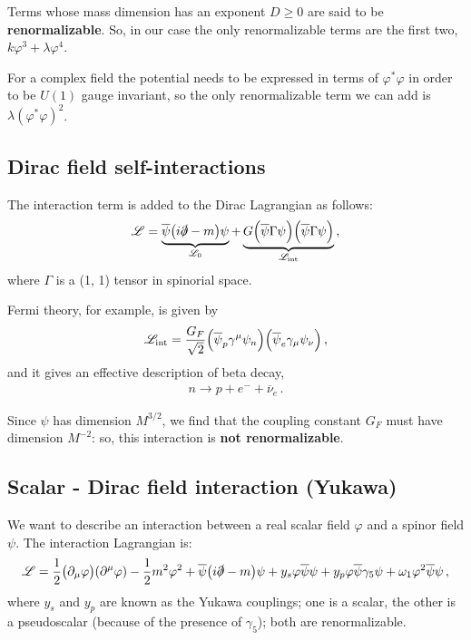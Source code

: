 \documentclass[main.tex]{subfiles}
\begin{document}
Terms whose mass dimension has an exponent \(D \geq 0 \) are said to be \textbf{renormalizable}.
So, in our case the only renormalizable terms are the first two, \(k \varphi^{3 } + \lambda \varphi^{4}\). 

For a complex field the potential needs to be expressed in terms of \(\varphi^{*} \varphi \) in order to be \(U(1)\) gauge invariant, so the only renormalizable term we can add is \(\lambda (\varphi^{*} \varphi )^2\). 

\subsection{Dirac field self-interactions}

The interaction term is added to the Dirac Lagrangian as follows: 
%
\begin{align}
\mathscr{L} 
= \underbrace{\overline{\psi} \qty(i \slashed{\partial} - m) \psi }_{\mathscr{L}_{0}}
+ 
\underbrace{G \qty(\overline{\psi} \Gamma \psi ) \qty(\overline{\psi} \Gamma \psi )}_{\mathscr{L} _{\text{int}}}
\,,
\end{align}
%
where \(\Gamma \) is a (1, 1) tensor in spinorial space. 

Fermi theory, for example, is given by 
%
\begin{align}
\mathscr{L} _{\text{int}} = \frac{G_F}{\sqrt{2}}
\qty(\overline{\psi}_{p} \gamma^{\mu } \psi_{n}) \qty(\overline{\psi}_{e} \gamma_{\mu } \psi_{\nu })
\,,
\end{align}
%
and it gives an effective description of beta decay, 
%
\begin{align}
n \to p + e^{-} + \overline{\nu}_{e}
\,.
\end{align}

Since \(\psi \) has dimension \(M^{3/2}\), we find that the coupling constant \(G_F\) must have dimension \(M^{-2}\): so, this interaction is \textbf{not renormalizable}.

\subsection{Scalar - Dirac field interaction (Yukawa)}

We want to describe an interaction between a real scalar field \(\varphi \) and a spinor field \(\psi \). The interaction Lagrangian is: 
%
\begin{align}
\mathscr{L} = \frac{1}{2} \qty(\partial_{\mu } \varphi ) \qty(\partial^{\mu} \varphi )
- \frac{1}{2} m^2\varphi^2
+ \overline{\psi} \qty(i \slashed{\partial} - m)\psi 
+ y_{s}  \varphi \overline{\psi} \psi 
+ y_{p} \varphi \overline{\psi} \gamma_{5} \psi 
+ \omega_{1} \varphi^2 \overline{\psi} \psi 
\,,
\end{align}
%
where \(y_s\) and \(y_p\) are known as the Yukawa couplings; one is a scalar, the other is a pseudoscalar (because of the presence of \(\gamma_{5}\)); both are renormalizable. 
\end{document}
